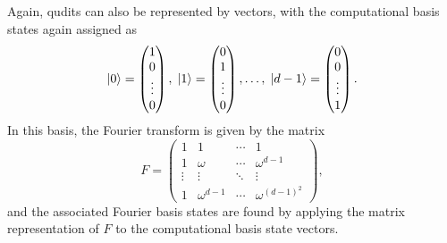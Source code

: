 Again, qudits can also be represented by vectors, with the computational basis states again assigned as
\begin{equation}
    \ket{0} = 
    \begin{pmatrix}
        1 \\
        0 \\
        \vdots\\
        0
    \end{pmatrix}, \;
    \ket{1} = 
    \begin{pmatrix}
        0 \\
        1 \\
        \vdots \\
        0
    \end{pmatrix}, \dots, \;
    \ket{d - 1} =
    \begin{pmatrix}
        0 \\
        0 \\
        \vdots \\
        1
    \end{pmatrix}.
\end{equation}
In this basis, the Fourier transform is given by the matrix
\begin{equation}
    F = \begin{pmatrix}
        1 & 1 & \cdots & 1\\
        1 & \omega & \cdots & \omega^{d-1}\\
        \vdots & \vdots & \ddots & \vdots\\
        1 & \omega^{d-1} & \cdots & \omega^{{(d-1)}^2}
    \end{pmatrix},
\end{equation}
and the associated Fourier basis states are found by applying the matrix representation of $F$ to the computational basis state vectors.

